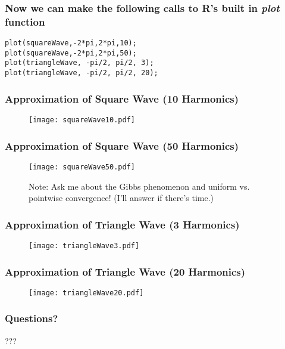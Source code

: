 \documentclass{beamer}
\begin{document}
\begin{frame}[fragile]
   \frametitle{Now we can make the following calls to R's built in \emph{plot} function}
   \begin{center}
   \begin{minipage}{100mm}
   \begin{lstlisting}
plot(squareWave,-2*pi,2*pi,10);
plot(squareWave,-2*pi,2*pi,50);
plot(triangleWave, -pi/2, pi/2, 3);
plot(triangleWave, -pi/2, pi/2, 20);
   \end{lstlisting}
   \end{minipage}
   \end{center}
\end{frame}

\begin{frame}[fragile]
   \frametitle{Approximation of Square Wave (10 Harmonics)}
   \begin{figure}
   \texttt{[image: squareWave10.pdf]}
   \end{figure}
\end{frame}

\begin{frame}[fragile]
   \frametitle{Approximation of Square Wave (50 Harmonics)}
   \begin{figure}
      \caption{Note: Ask me about the Gibbs phenomenon and uniform vs. pointwise convergence! (I'll answer if there's time.)}
      \texttt{[image: squareWave50.pdf]}
   \end{figure}
\end{frame}

\begin{frame}[fragile]
   \frametitle{Approximation of Triangle Wave (3 Harmonics)}
   \begin{figure}
   \texttt{[image: triangleWave3.pdf]}
   \end{figure}
\end{frame}

\begin{frame}[fragile]
   \frametitle{Approximation of Triangle Wave (20 Harmonics)}
   \begin{figure}
   \texttt{[image: triangleWave20.pdf]}
   \end{figure}
\end{frame}

\begin{frame}
   \frametitle{Questions?}
   \begin{center}
      {\fontsize{50}{60}\selectfont ???}
   \end{center}
\end{frame}
\end{document}
